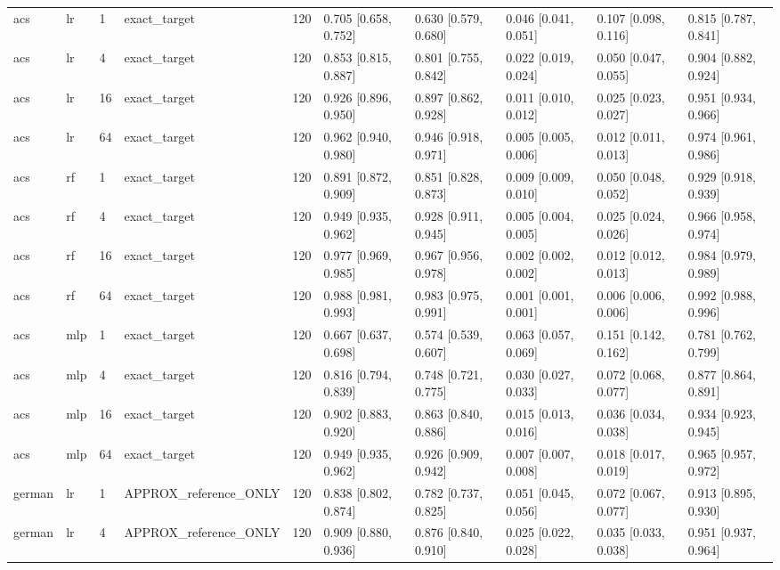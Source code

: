 \begin{tabular}{llllllllll}
acs & lr & 1 & exact\_target & 120 & 0.705 [0.658, 0.752] & 0.630 [0.579, 0.680] & 0.046 [0.041, 0.051] & 0.107 [0.098, 0.116] & 0.815 [0.787, 0.841] \\
acs & lr & 4 & exact\_target & 120 & 0.853 [0.815, 0.887] & 0.801 [0.755, 0.842] & 0.022 [0.019, 0.024] & 0.050 [0.047, 0.055] & 0.904 [0.882, 0.924] \\
acs & lr & 16 & exact\_target & 120 & 0.926 [0.896, 0.950] & 0.897 [0.862, 0.928] & 0.011 [0.010, 0.012] & 0.025 [0.023, 0.027] & 0.951 [0.934, 0.966] \\
acs & lr & 64 & exact\_target & 120 & 0.962 [0.940, 0.980] & 0.946 [0.918, 0.971] & 0.005 [0.005, 0.006] & 0.012 [0.011, 0.013] & 0.974 [0.961, 0.986] \\
acs & rf & 1 & exact\_target & 120 & 0.891 [0.872, 0.909] & 0.851 [0.828, 0.873] & 0.009 [0.009, 0.010] & 0.050 [0.048, 0.052] & 0.929 [0.918, 0.939] \\
acs & rf & 4 & exact\_target & 120 & 0.949 [0.935, 0.962] & 0.928 [0.911, 0.945] & 0.005 [0.004, 0.005] & 0.025 [0.024, 0.026] & 0.966 [0.958, 0.974] \\
acs & rf & 16 & exact\_target & 120 & 0.977 [0.969, 0.985] & 0.967 [0.956, 0.978] & 0.002 [0.002, 0.002] & 0.012 [0.012, 0.013] & 0.984 [0.979, 0.989] \\
acs & rf & 64 & exact\_target & 120 & 0.988 [0.981, 0.993] & 0.983 [0.975, 0.991] & 0.001 [0.001, 0.001] & 0.006 [0.006, 0.006] & 0.992 [0.988, 0.996] \\
acs & mlp & 1 & exact\_target & 120 & 0.667 [0.637, 0.698] & 0.574 [0.539, 0.607] & 0.063 [0.057, 0.069] & 0.151 [0.142, 0.162] & 0.781 [0.762, 0.799] \\
acs & mlp & 4 & exact\_target & 120 & 0.816 [0.794, 0.839] & 0.748 [0.721, 0.775] & 0.030 [0.027, 0.033] & 0.072 [0.068, 0.077] & 0.877 [0.864, 0.891] \\
acs & mlp & 16 & exact\_target & 120 & 0.902 [0.883, 0.920] & 0.863 [0.840, 0.886] & 0.015 [0.013, 0.016] & 0.036 [0.034, 0.038] & 0.934 [0.923, 0.945] \\
acs & mlp & 64 & exact\_target & 120 & 0.949 [0.935, 0.962] & 0.926 [0.909, 0.942] & 0.007 [0.007, 0.008] & 0.018 [0.017, 0.019] & 0.965 [0.957, 0.972] \\
german & lr & 1 & APPROX\_reference\_ONLY & 120 & 0.838 [0.802, 0.874] & 0.782 [0.737, 0.825] & 0.051 [0.045, 0.056] & 0.072 [0.067, 0.077] & 0.913 [0.895, 0.930] \\
german & lr & 4 & APPROX\_reference\_ONLY & 120 & 0.909 [0.880, 0.936] & 0.876 [0.840, 0.910] & 0.025 [0.022, 0.028] & 0.035 [0.033, 0.038] & 0.951 [0.937, 0.964] \\

\end{tabular}

